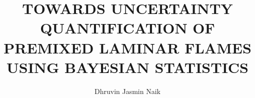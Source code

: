 \documentclass[10pt,oneside]{ubthesis}
\title{TOWARDS UNCERTAINTY QUANTIFICATION OF PREMIXED LAMINAR FLAMES USING BAYESIAN STATISTICS}
\author{Dhruvin Jasmin Naik}
\begin{document}
\begin{titlepage}
\maketitle
\end{titlepage}

\begin{ubfrontmatter}
\makecopyright
\cleardoublepage
\begin{acknowledgements}
  \doublespacing
  
\end{acknowledgements}

\singlespacing
\tableofcontents

\cleardoublepage
\listoffigures
\cleardoublepage
\listoftables
\cleardoublepage

\doublespacing

\begin{abstract}

\end{abstract}
\end{ubfrontmatter}

\doublespacing





%






\begin{ubbackmatter}

\end{ubbackmatter}
\end{document}
